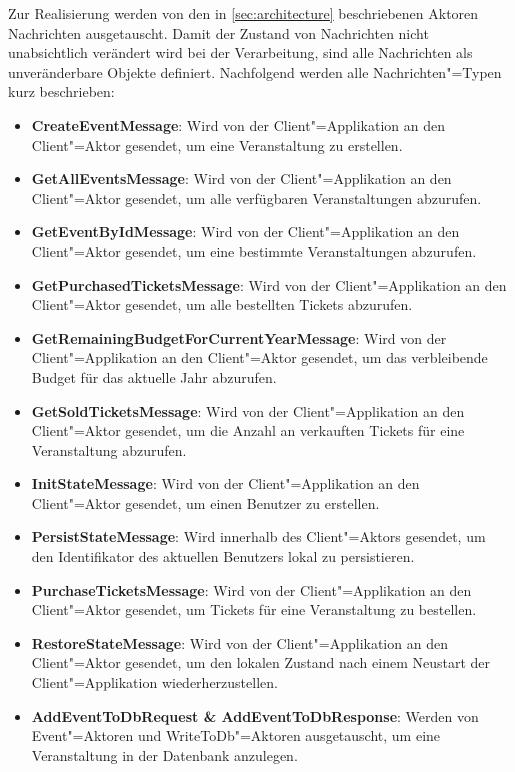 Zur Realisierung werden von den in \autoref{sec:architecture} beschriebenen Aktoren Nachrichten ausgetauscht.
Damit der Zustand von Nachrichten nicht unabsichtlich verändert wird bei der Verarbeitung, sind alle Nachrichten als unveränderbare Objekte definiert.
Nachfolgend werden alle Nachrichten"=Typen kurz beschrieben:

\begin{itemize}[itemsep=-.5em,leftmargin=*]
    \item \textbf{CreateEventMessage}: Wird von der Client"=Applikation an den Client"=Aktor gesendet, um eine Veranstaltung zu erstellen.
    \item \textbf{GetAllEventsMessage}: Wird von der Client"=Applikation an den Client"=Aktor gesendet, um alle verfügbaren Veranstaltungen abzurufen.
    \item \textbf{GetEventByIdMessage}: Wird von der Client"=Applikation an den Client"=Aktor gesendet, um eine bestimmte Veranstaltungen abzurufen.
    \item \textbf{GetPurchasedTicketsMessage}: Wird von der Client"=Applikation an den Client"=Aktor gesendet, um alle bestellten Tickets abzurufen.
    \item \textbf{GetRemainingBudgetForCurrentYearMessage}: Wird von der Client"=Applikation an den Client"=Aktor gesendet, um das verbleibende Budget für das aktuelle Jahr abzurufen.
    \item \textbf{GetSoldTicketsMessage}: Wird von der Client"=Applikation an den Client"=Aktor gesendet, um die Anzahl an verkauften Tickets für eine Veranstaltung abzurufen.
    \item \textbf{InitStateMessage}: Wird von der Client"=Applikation an den Client"=Aktor gesendet, um einen Benutzer zu erstellen.
    \item \textbf{PersistStateMessage}: Wird innerhalb des Client"=Aktors gesendet, um den Identifikator des aktuellen Benutzers lokal zu persistieren.
    \item \textbf{PurchaseTicketsMessage}: Wird von der Client"=Applikation an den Client"=Aktor gesendet, um Tickets für eine Veranstaltung zu bestellen.
    \item \textbf{RestoreStateMessage}: Wird von der Client"=Applikation an den Client"=Aktor gesendet, um den lokalen Zustand nach einem Neustart der Client"=Applikation wiederherzustellen.
    \item \textbf{AddEventToDbRequest \& AddEventToDbResponse}: Werden von Event"=Aktoren und WriteToDb"=Aktoren ausgetauscht, um eine Veranstaltung in der Datenbank anzulegen.

\end{itemize}
